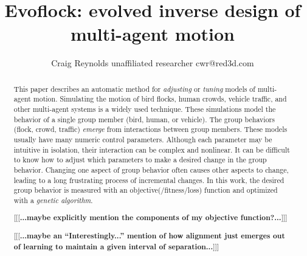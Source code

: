\documentclass[letterpaper]{article}
\begin{document}
\title{Evoflock: evolved inverse design of multi-agent motion}

\author{Craig Reynolds\authorcr
    unaffiliated researcher\authorcr 
    cwr@red3d.com}


\captionsetup{hypcap=false}


\date{}

\maketitle



\begin{abstract}
    This paper describes an automatic method for \textit{adjusting} or \textit{tuning} models of multi-agent motion. Simulating the motion of bird flocks, human crowds, vehicle traffic, and other multi-agent systems is a widely used technique. These simulations model the behavior of a single group member (bird, human, or vehicle). The group behaviors (flock, crowd, traffic) \textit{emerge} from interactions between group members. These models usually have many numeric control parameters. Although each parameter may be intuitive in isolation, their interaction can be complex and nonlinear. It can be difficult to know how to adjust which parameters to make a desired change in the group behavior. Changing one aspect of group behavior often causes other aspects to change, leading to a long frustrating process of incremental changes. In this work, the desired group behavior is measured with an objective(/fitness/loss) function and optimized with a \textit{genetic algorithm}.

    [[[\textbf{...maybe explicitly mention the components of my objective function?...}]]]

    [[[\textbf{...maybe an ``Interestingly...'' mention of how alignment just emerges out of learning to maintain a given interval of separation...}]]]
\end{abstract}
\end{document}
